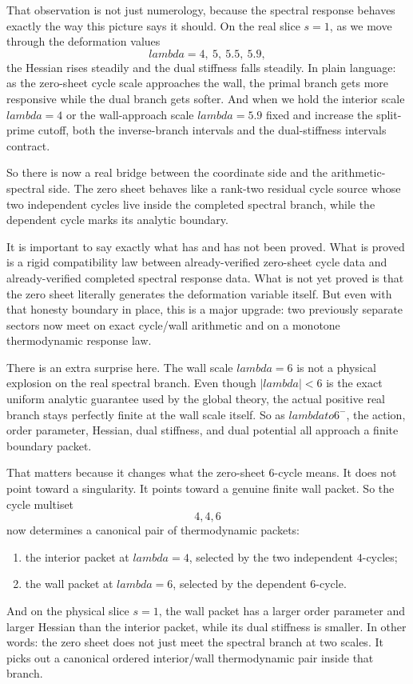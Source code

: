\documentclass[11pt]{article}
\def\lambda{lambda}%
\def\to{ to }%
\begin{document}
That observation is not just numerology, because the spectral response behaves exactly the way this picture says it should. On the real slice $s=1$, as we move through the deformation values
\[
\lambda=4,\ 5,\ 5.5,\ 5.9,
\]
the Hessian rises steadily and the dual stiffness falls steadily. In plain language: as the zero-sheet cycle scale approaches the wall, the primal branch gets more responsive while the dual branch gets softer. And when we hold the interior scale $\lambda=4$ or the wall-approach scale $\lambda=5.9$ fixed and increase the split-prime cutoff, both the inverse-branch intervals and the dual-stiffness intervals contract.

So there is now a real bridge between the coordinate side and the arithmetic-spectral side. The zero sheet behaves like a rank-two residual cycle source whose two independent cycles live inside the completed spectral branch, while the dependent cycle marks its analytic boundary.

It is important to say exactly what has and has not been proved. What is proved is a rigid compatibility law between already-verified zero-sheet cycle data and already-verified completed spectral response data. What is not yet proved is that the zero sheet literally generates the deformation variable itself. But even with that honesty boundary in place, this is a major upgrade: two previously separate sectors now meet on exact cycle/wall arithmetic and on a monotone thermodynamic response law.

There is an extra surprise here. The wall scale $\lambda=6$ is not a physical explosion on the real spectral branch. Even though $|\lambda|<6$ is the exact uniform analytic guarantee used by the global theory, the actual positive real branch stays perfectly finite at the wall scale itself. So as $\lambda\to6^{-}$, the action, order parameter, Hessian, dual stiffness, and dual potential all approach a finite boundary packet.

That matters because it changes what the zero-sheet $6$-cycle means. It does not point toward a singularity. It points toward a genuine finite wall packet. So the cycle multiset
\[
4,4,6
\]
now determines a canonical pair of thermodynamic packets:
\begin{enumerate}
\item the interior packet at $\lambda=4$, selected by the two independent $4$-cycles;
\item the wall packet at $\lambda=6$, selected by the dependent $6$-cycle.
\end{enumerate}
And on the physical slice $s=1$, the wall packet has a larger order parameter and larger Hessian than the interior packet, while its dual stiffness is smaller. In other words: the zero sheet does not just meet the spectral branch at two scales. It picks out a canonical ordered interior/wall thermodynamic pair inside that branch.
\end{document}
